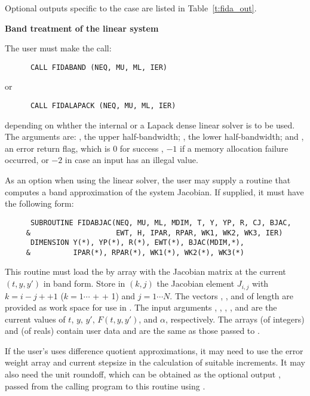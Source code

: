 \begin{Steps}
  Optional outputs specific to the {\dense} case are listed in
  Table~\ref{t:fida_out}.


  {\s} {\bf Band treatment of the linear system}
  
  The user must make the call:
\begin{verbatim}
      CALL FIDABAND (NEQ, MU, ML, IER)
\end{verbatim}
  or
\begin{verbatim}
      CALL FIDALAPACK (NEQ, MU, ML, IER)
\end{verbatim}
  depending on whther the internal
  or a Lapack dense linear solver is to be used.
  The arguments are: , the upper half-bandwidth; , 
  the lower half-bandwidth; and , an error return flag, which is  
  $0$ for success , $-1$ if a memory allocation failure occurred, or $-2$ 
  in case an input has an illegal value.     
  
  As an option when using the {\band} linear solver, the user may supply a
  routine that computes a band approximation of the system Jacobian. If supplied,
  it must have the following form:
\begin{verbatim}
      SUBROUTINE FIDABJAC(NEQ, MU, ML, MDIM, T, Y, YP, R, CJ, BJAC,
     &                    EWT, H, IPAR, RPAR, WK1, WK2, WK3, IER)
      DIMENSION Y(*), YP(*), R(*), EWT(*), BJAC(MDIM,*), 
     &          IPAR(*), RPAR(*), WK1(*), WK2(*), WK3(*)
\end{verbatim}
  This routine must load the  by  array  with the
  Jacobian matrix at the current $(t, y, y')$ in band form.  Store in
  $(k,j)$ the Jacobian element $J_{i,j}$ with $k = i - j + $$ + 1$
  ($k = 1 \cdots $ +  + 1) and $j = 1 \cdots N$. The vectors
  , , and  of length  are provided as work space
  for use in .
  The input arguments , , , , and  are the
  current values of $t$, $y$, $y'$, $F(t,y,y')$, and $\alpha$, respectively.
  The arrays  (of integers) and  (of reals) contain user data
  and are the same as those passed to .

  If the user's  uses difference quotient approximations, it
  may need to use the error weight array  and current stepsize 
  in the calculation of suitable increments.  It may also need the unit
  roundoff, which can be obtained as the optional output ,
  passed from the calling program to this routine using .


\end{Steps}
